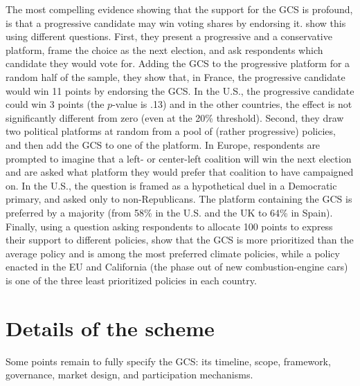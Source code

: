\documentclass[12pt,english]{article}
\begin{document}
The most compelling evidence showing that the support for the GCS is profound, is that a progressive candidate may win voting shares by endorsing it. \citet{fabre_international_2023} show this using different questions. First, they present a progressive and a conservative platform, frame the choice as the next election, and ask respondents which candidate they would vote for. Adding the GCS to the progressive platform for a random half of the sample, they show that, in France, the progressive candidate would win 11 points by endorsing the GCS. In the U.S., the progressive candidate could win 3 points (the $p$-value is .13) and in the other countries, the effect is not significantly different from zero (even at the 20\% threshold). Second, they draw two political platforms at random from a pool of (rather progressive) policies, and then add the GCS to one of the platform. In Europe, respondents are prompted to imagine that a left- or center-left coalition will win the next election and are asked what platform they would prefer that coalition to have campaigned on. In the U.S., the question is framed as a hypothetical duel in a Democratic primary, and asked only to non-Republicans. The platform containing the GCS is preferred by a majority (from 58\% in the U.S. and the UK to 64\% in Spain). Finally, using a question asking respondents to allocate 100 points to express their support to different policies, \citet{fabre_international_2023} show that the GCS is more prioritized than the average policy and is among the most preferred climate policies, while a policy enacted in the EU and California (the phase out of new combustion-engine cars) is one of the three least prioritized policies in each country. 


\section{Details of the scheme}\label{sec:details}

Some points remain to fully specify the GCS: its timeline, scope, framework, governance, market design, and participation mechanisms. 
\end{document}
